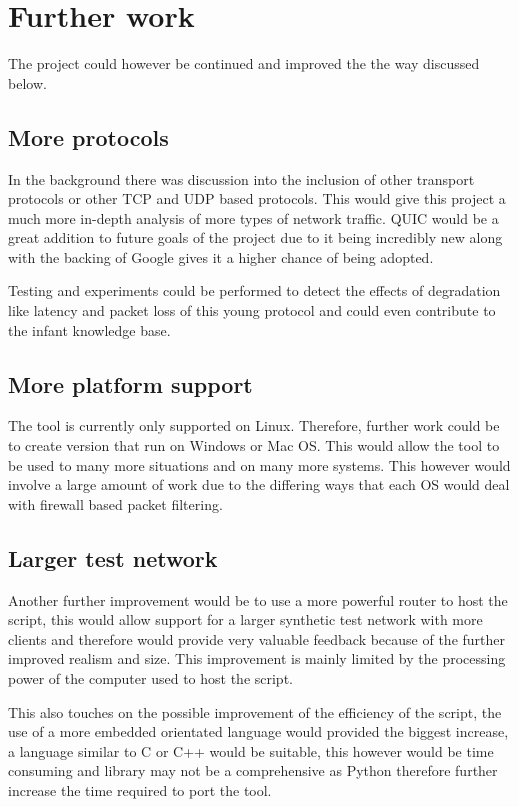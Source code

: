 \section{Further work}
The project could however be continued and improved the the way discussed below.

\subsection{More protocols}
In the background there was discussion into the inclusion of other transport protocols or other TCP and UDP based protocols. This would give this project a much more in-depth analysis of more types of network traffic. QUIC would be a great addition to future goals of the project due to it being incredibly new along with the backing of Google gives it a higher chance of being adopted. 

Testing and experiments could be performed to detect the effects of degradation like latency and packet loss of this young protocol and could even contribute to the infant knowledge base.


\subsection{More platform support}
The tool is currently only supported on Linux. Therefore, further work could be to create version that run on Windows or Mac OS. This would allow the tool to be used to many more situations and on many more systems. This however would involve a large amount of work due to the differing ways that each OS would deal with firewall based packet filtering.


\subsection{Larger test network}
Another further improvement would be to use a more powerful router to host the script, this would allow support for a larger synthetic test network with more clients and therefore would provide very valuable feedback because of the further improved realism and size. This improvement is mainly limited by the processing power of the computer used to host the script. 

This also touches on the possible improvement of the efficiency of the script, the use of a more embedded orientated language would provided the biggest increase, a language similar to C or C++ would be suitable, this however would be time consuming and library may not be a comprehensive as Python therefore further increase the time required to port the tool.